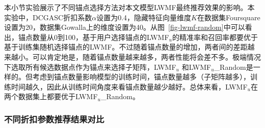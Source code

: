 本小节实验展示了不同锚点选择方法对本文模型LWMF最终推荐效果的影响。本实验中，DCGASC折扣系数$\alpha$设置为0.4，隐藏特征向量维度$K$在数据集Foursquare设置为20，数据集Gowalla上的维度设置为40。从图~\ref{fig-lwmf-random}中可以看出，锚点数量从0到100，基于用户选择锚点的{LWMF$_u$}的精准率和召回率都要优于基于训练集随机选择锚点的LWMF。不过随着锚点数量的增加，两者间的差距越来越小。可以肯定地是，随着锚点数量越来越多，两者性能将会差不多。极端情况下选取所有候选数据点作为锚点来选择子矩阵，{LWMF$_u$}
和{LWMF$_u$\_Random}是一样的。但考虑到锚点数量影响模型的训练时间，锚点数量越多（子矩阵越多），训练时间越久，因此从训练时间角度来看锚点数量越少越好。总体来看，{LWMF$_u$}在两个数据集上都要优于{LWMF$_u$\_Random}。

\subsubsection{不同折扣参数推荐结果对比}

